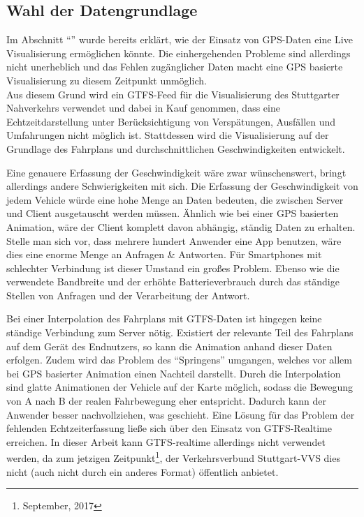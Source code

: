 \subsection{Wahl der Datengrundlage}
\label{ssub:wahl_der_datengrundlage}
  Im Abschnitt "`"' wurde bereits erklärt, wie der Einsatz von GPS-Daten eine Live Visualisierung ermöglichen könnte. Die einhergehenden Probleme sind allerdings nicht unerheblich und das Fehlen zugänglicher Daten macht eine GPS basierte Visualisierung zu diesem Zeitpunkt unmöglich.\\

  Aus diesem Grund wird ein GTFS-Feed für die Visualisierung des Stuttgarter Nahverkehrs verwendet und dabei in Kauf genommen, dass eine Echtzeitdarstellung unter Berücksichtigung von Verspätungen, Ausfällen und Umfahrungen nicht möglich ist. Stattdessen wird die Visualisierung auf der Grundlage des Fahrplans und durchschnittlichen Geschwindigkeiten entwickelt.

  Eine genauere Erfassung der Geschwindigkeit wäre zwar wünschenswert, bringt allerdings andere Schwierigkeiten mit sich. Die Erfassung der Geschwindigkeit von jedem Vehicle würde eine hohe Menge an Daten bedeuten, die zwischen Server und Client ausgetauscht werden müssen. Ähnlich wie bei einer GPS basierten Animation, wäre der Client komplett davon abhängig, ständig Daten zu erhalten. Stelle man sich vor, dass mehrere hundert Anwender eine App benutzen, wäre dies eine enorme Menge an Anfragen \& Antworten. Für Smartphones mit schlechter Verbindung ist dieser Umstand ein großes Problem. Ebenso wie die verwendete Bandbreite und der erhöhte Batterieverbrauch durch das ständige Stellen von Anfragen und der Verarbeitung der Antwort.

  Bei einer Interpolation des Fahrplans mit GTFS-Daten ist hingegen keine ständige Verbindung zum Server nötig. Existiert der relevante Teil des Fahrplans auf dem Gerät des Endnutzers, so kann die Animation anhand dieser Daten erfolgen. Zudem wird das Problem des "`Springens"' umgangen, welches vor allem bei GPS basierter Animation einen Nachteil darstellt. Durch die Interpolation sind glatte Animationen der Vehicle auf der Karte möglich, sodass die Bewegung von A nach B der realen Fahrbewegung eher entspricht. Dadurch kann der Anwender besser nachvollziehen, was geschieht.
  Eine Lösung für das Problem der fehlenden Echtzeiterfassung ließe sich über den Einsatz von GTFS-Realtime erreichen. In dieser Arbeit kann GTFS-realtime allerdings nicht verwendet werden, da zum jetzigen Zeitpunkt\footnote{September, 2017}, der Verkehrsverbund Stuttgart-VVS dies nicht (auch nicht durch ein anderes Format) öffentlich anbietet.
  
